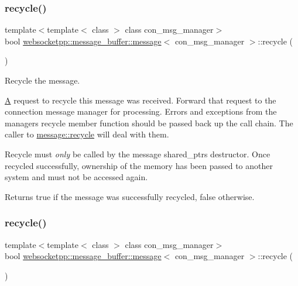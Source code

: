 \subsubsection{\texorpdfstring{recycle()}{recycle()}\hspace{0.1cm}{\footnotesize\ttfamily [1/2]}}
{\footnotesize\ttfamily template$<$template$<$ class $>$ class con\+\_\+msg\+\_\+manager$>$ \\
bool \mbox{\hyperlink{classwebsocketpp_1_1message__buffer_1_1message}{websocketpp\+::message\+\_\+buffer\+::message}}$<$ con\+\_\+msg\+\_\+manager $>$\+::recycle (\begin{DoxyParamCaption}{ }\end{DoxyParamCaption})\hspace{0.3cm}{\ttfamily [inline]}}



Recycle the message. 

\mbox{\hyperlink{struct_a}{A}} request to recycle this message was received. Forward that request to the connection message manager for processing. Errors and exceptions from the manager\textquotesingle{}s recycle member function should be passed back up the call chain. The caller to \mbox{\hyperlink{classwebsocketpp_1_1message__buffer_1_1message_a2c19e247389598d9f81c9447ddcfba51}{message\+::recycle}} will deal with them.

Recycle must {\itshape only} be called by the message shared\+\_\+ptr\textquotesingle{}s destructor. Once recycled successfully, ownership of the memory has been passed to another system and must not be accessed again.

\begin{DoxyReturn}{Returns}
true if the message was successfully recycled, false otherwise. 
\end{DoxyReturn}
\mbox{\label{classwebsocketpp_1_1message__buffer_1_1message_a2c19e247389598d9f81c9447ddcfba51}} 
\subsubsection{\texorpdfstring{recycle()}{recycle()}\hspace{0.1cm}{\footnotesize\ttfamily [2/2]}}
{\footnotesize\ttfamily template$<$template$<$ class $>$ class con\+\_\+msg\+\_\+manager$>$ \\
bool \mbox{\hyperlink{classwebsocketpp_1_1message__buffer_1_1message}{websocketpp\+::message\+\_\+buffer\+::message}}$<$ con\+\_\+msg\+\_\+manager $>$\+::recycle (\begin{DoxyParamCaption}{ }\end{DoxyParamCaption})\hspace{0.3cm}{\ttfamily [inline]}}




